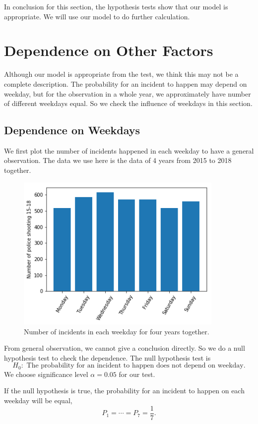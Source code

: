 \documentclass[11pt,a4paper,english]{article}
\begin{document}
In conclusion for this section, the hypothesis tests show that our model is appropriate. We will use our model to do further calculation.
\section{Dependence on Other Factors}
Although our model is appropriate from the test, we think this may not be a complete description. 
The probability for an incident to happen may depend on weekday, but for the observation in a whole year, we approximately have number of different weekdays equal. 
So we check the influence of weekdays in this section.
\subsection{Dependence on Weekdays}
We first plot the number of incidents happened in each weekday to have a general observation. The data we use here is the data of 4 years from 2015 to 2018 together.
\begin{figure}[htbp]
	\centering
	\includegraphics[width = 10cm]{weekdays.png}
	\caption{Number of incidents in each weekday for four years together.}
\end{figure}

From general observation, we cannot give a conclusion directly. So we do a null hypothesis test to check the dependence. The null hypothesis test is
\begin{equation*}
	H_{0}:\text{ The probability for an incident to happen does not depend on weekday.}
\end{equation*} 
We choose significance level $\alpha = 0.05$ for our test.

If the null hypothesis is true, the probability for an incident to happen on each weekday will be equal,
\begin{equation*}
	P_{1} = \cdots = P_{7} = \frac{1}{7}.
\end{equation*}
\end{document}
